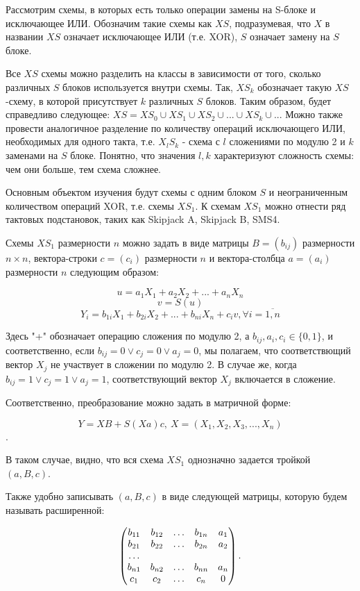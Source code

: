 \documentclass[a4paper,12pt]{report}
\theoremstyle{plain} %
\theoremstyle{definition}
\theoremstyle{remark}
\begin{document}
\begin{large}
Рассмотрим схемы, в которых есть только операции замены на S-блоке и исключающее ИЛИ. Обозначим такие схемы как $XS$, подразумевая, что $X$ в названии $XS$ означает исключающее ИЛИ (т.е. XOR), $S$ означает замену на $S$ блоке. 

Все $XS$ схемы можно разделить на классы в зависимости от того, сколько различных $S$ блоков используется внутри схемы. Так, $XS_k$ обозначает такую $XS$-схему, в которой присутствует $k$ различных $S$ блоков. Таким образом, будет справедливо следующее: $XS = XS_0 \cup XS_1 \cup XS_2 \cup ... \cup XS_k \cup...$ Можно также провести аналогичное разделение по количеству операций исключающего ИЛИ, необходимых для одного такта, т.е. $X_lS_k$ - схема с $l$ сложениями по модулю 2 и $k$ заменами на $S$ блоке. Понятно, что значения $l, k$ характеризуют сложность схемы: чем они больше, тем схема сложнее.

Основным объектом изучения будут схемы с одним блоком $S$ и неограниченным количеством операций XOR, т.е. схемы $XS_1$. К схемам $XS_1$ можно отнести ряд тактовых подстановок, таких как Skipjack A, Skipjack B, SMS4. 

Схемы $XS_1$ размерности $n$ можно задать в виде матрицы $B = (b_{ij})$ размерности $n \times n$, вектора-строки $c = (c_i)$ размерности $n$ и вектора-столбца $a=(a_i)$ размерности $n$ следующим образом:

$$u = a_1X_1 + a_2X_2 + ... + a_nX_n$$
$$v = S(u)$$
$$Y_i = b_{1i}X_1 + b_{2i}X_2 + ... + b_{ni}X_n + c_iv, \forall i = \overline{1,n}$$

Здесь "+" обозначает операцию сложения по модулю 2, а $b_{ij}, a_i, c_i \in \{0, 1\}$, и соответственно, если $b_{ij} = 0 \vee c_j=0 \vee a_j = 0$, мы полагаем, что соответствющий вектор $X_j$ не участвует в сложении по модулю 2. В случае же, когда $b_{ij} = 1 \vee c_j=1 \vee a_j = 1$, соответствующий вектор $X_j$ включается в сложение.

Соответственно, преобразование можно задать в матричной форме:

$$Y = XB + S(Xa)c, ~X = (X_1, X_2, X_3, ..., X_n)$$.

В таком случае, видно, что вся схема $XS_1$ однозначно задается тройкой $(a, B, c)$. 

Также удобно записывать $(a, B, c)$ в виде следующей матрицы, которую будем называть расширенной:

$$
\begin{pmatrix}
b_{11} & b_{12} & \ldots & b_{1n} & a_1\\
b_{21} & b_{22} & \ldots & b_{2n} & a_2\\
\dotfill\\
b_{n1} & b_{n2} & \ldots & b_{nn} & a_n\\
c_1    & c_2    & \ldots & c_n    & 0\\
\end{pmatrix}.
$$


\end{large}
\end{document}
